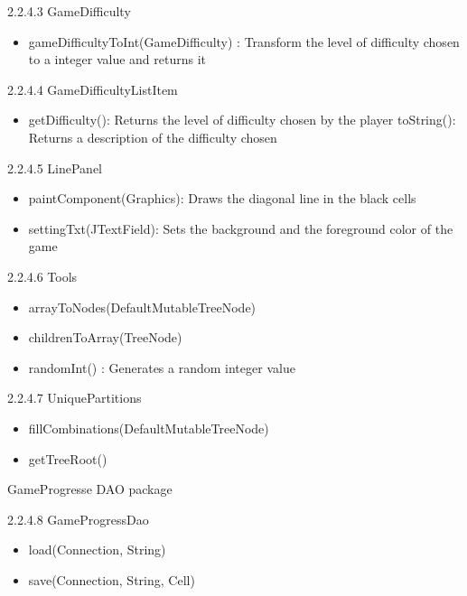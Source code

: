 \documentclass[12pt]{article}
\begin{document}
2.2.4.3 GameDifficulty\newline
\begin{itemize}
\item gameDifficultyToInt(GameDifficulty) : Transform the level of difficulty chosen to a integer value and returns it \newline
\end{itemize}

2.2.4.4 GameDifficultyListItem\newline
\begin{itemize}
\item getDifficulty(): Returns the level of difficulty chosen by the player
toString(): Returns a description of the difficulty chosen \newline
\end{itemize}

2.2.4.5 LinePanel\newline
\begin{itemize}
\item paintComponent(Graphics): Draws the diagonal line in the black cells
\item settingTxt(JTextField): Sets the background and the foreground color of the game \newline
\end{itemize}

2.2.4.6 Tools\newline
\begin{itemize}
\item arrayToNodes(DefaultMutableTreeNode)
\item childrenToArray(TreeNode)
\item randomInt() : Generates a random integer value \newline
\end{itemize}


2.2.4.7 UniquePartitions\newline
\begin{itemize}
\item fillCombinations(DefaultMutableTreeNode)
\item getTreeRoot() \newline
\end{itemize}

GameProgresse DAO package\newline

2.2.4.8 GameProgressDao\newline
\begin{itemize}
\item load(Connection, String)
\item save(Connection, String, Cell) \newline
\end{itemize}
\end{document}
